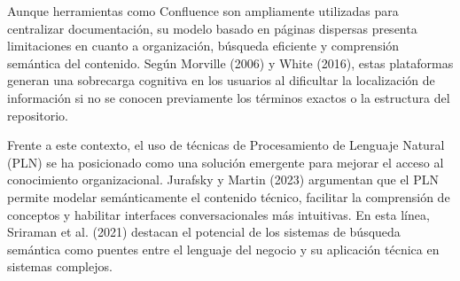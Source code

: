Aunque herramientas como Confluence son ampliamente utilizadas para centralizar documentación, su modelo basado en páginas dispersas presenta limitaciones en cuanto a organización, búsqueda eficiente y comprensión semántica del contenido. Según Morville (2006) y White (2016), estas plataformas generan una sobrecarga cognitiva en los usuarios al dificultar la localización de información si no se conocen previamente los términos exactos o la estructura del repositorio.

Frente a este contexto, el uso de técnicas de Procesamiento de Lenguaje Natural (PLN) se ha posicionado como una solución emergente para mejorar el acceso al conocimiento organizacional. Jurafsky y Martin (2023) argumentan que el PLN permite modelar semánticamente el contenido técnico, facilitar la comprensión de conceptos y habilitar interfaces conversacionales más intuitivas. En esta línea, Sriraman et al. (2021) destacan el potencial de los sistemas de búsqueda semántica como puentes entre el lenguaje del negocio y su aplicación técnica en sistemas complejos.

